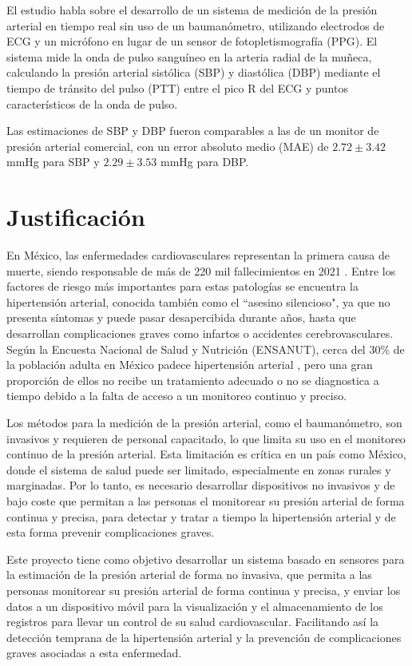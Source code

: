     El estudio habla sobre el desarrollo de un sistema de medición de la presión arterial en tiempo real sin uso de un baumanómetro, utilizando electrodos de ECG y un micrófono en lugar de un sensor de fotopletismografía (PPG). El sistema mide la onda de pulso sanguíneo en la arteria radial de la muñeca, calculando la presión arterial sistólica (SBP) y diastólica (DBP) mediante el tiempo de tránsito del pulso (PTT) entre el pico R del ECG y puntos característicos de la onda de pulso.
    
    Las estimaciones de SBP y DBP fueron comparables a las de un monitor de presión arterial comercial, con un error absoluto medio (MAE) de $2.72 \pm 3.42$ mmHg para SBP y $2.29 \pm 3.53$ mmHg para DBP.


\newpage
\section{Justificación}

En México, las enfermedades cardiovasculares representan la primera causa de muerte, siendo responsable de más de 220 mil fallecimientos en 2021 \cite{SSFallecimientos}. Entre los factores de riesgo más importantes para estas patologías se encuentra la hipertensión arterial, conocida también como el ``asesino silencioso", ya que no presenta síntomas y puede pasar desapercibida durante años, hasta que desarrollan complicaciones graves como infartos o accidentes cerebrovasculares. Según la Encuesta Nacional de Salud y Nutrición (ENSANUT), cerca del 30\% de la población adulta en México padece hipertensión arterial \cite{ENSANUT}, pero una gran proporción de ellos no recibe un tratamiento adecuado o no se diagnostica a tiempo debido a la falta de acceso a un monitoreo continuo y preciso.

Los métodos para la medición de la presión arterial, como el baumanómetro, son invasivos y requieren de personal capacitado, lo que limita su uso en el monitoreo continuo de la presión arterial. Esta limitación es crítica en un país como México, donde el sistema de salud puede ser limitado, especialmente en zonas rurales y marginadas. Por lo tanto, es necesario desarrollar dispositivos no invasivos y de bajo coste que permitan a las personas el monitorear su presión arterial de forma continua y precisa, para detectar y tratar a tiempo la hipertensión arterial y de esta forma prevenir complicaciones graves.

Este proyecto tiene como objetivo desarrollar un sistema basado en sensores para la estimación de la presión arterial de forma no invasiva, que permita a las personas monitorear su presión arterial de forma continua y precisa, y enviar los datos a un dispositivo móvil para la visualización y el almacenamiento de los registros para llevar un control de su salud cardiovascular. Facilitando así la detección temprana de la hipertensión arterial y la prevención de complicaciones graves asociadas a esta enfermedad.

